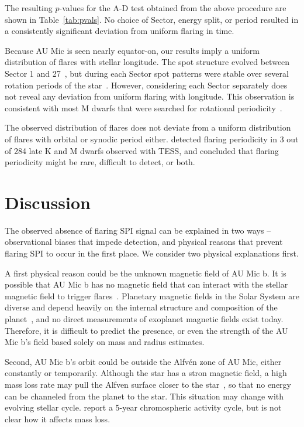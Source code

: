 \documentclass[fleqn,usenatbib,letters]{mnras}%
\begin{document}
The resulting $p$-values for the A-D test obtained from the above procedure are shown in Table~\ref{tab:pvals}. No choice of Sector, energy split, or period resulted in a consistently significant deviation from uniform flaring in time. 

Because AU Mic is seen nearly equator-on, our results imply a uniform distribution of flares with stellar longitude. The spot structure evolved between Sector 1 and 27~\citep{martioli2021new}, but during each Sector spot patterns were stable over several rotation periods of the star~\citep{szabo2021changing}. However, considering each Sector separately does not reveal any deviation from uniform flaring with longitude. This observation is consistent with most M dwarfs that were searched for rotational periodicity~\citep{doyle2018, doyle2019}. 

The observed distribution of flares does not deviate from a uniform distribution of flares with orbital or synodic period either.  \citet{howard2021evryflare} detected flaring periodicity in 3 out of 284 late K and M dwarfs observed with TESS, and concluded that flaring periodicity might be rare, difficult to detect, or both. 

\section{Discussion}
\label{sec:discussion}

The observed absence of flaring SPI signal can be explained in two ways -- observational biases that impede detection, and physical reasons that prevent flaring SPI to occur in the first place. We consider two physical explanations first.

A first physical reason could be the unknown magnetic field of AU Mic b. It is possible that AU Mic b has no magnetic field that can interact with the stellar magnetic field to trigger flares~\citep{lanza2018close-by}. Planetary magnetic fields in the Solar System are diverse and depend heavily on the internal structure and composition of the planet~\citep{stevenson2003planetary}, and no direct measurements of exoplanet magnetic fields exist today. Therefore, it is difficult to predict the presence, or even the strength of the AU Mic b's field based solely on mass and radius estimates.

Second, AU Mic b's orbit could be outside the Alfv\'en zone of AU Mic, either constantly or temporarily. Although the star has a stron magnetic field, a high mass loss rate may pull the Alfven surface closer to the star~\citep{kavanagh2021}, so that no energy can be channeled from the planet to the star. This situation may change with evolving stellar cycle. \citet{ibanez-bustos2019first} report a 5-year chromospheric activity cycle, but is not clear how it affects mass loss.
\end{document}
